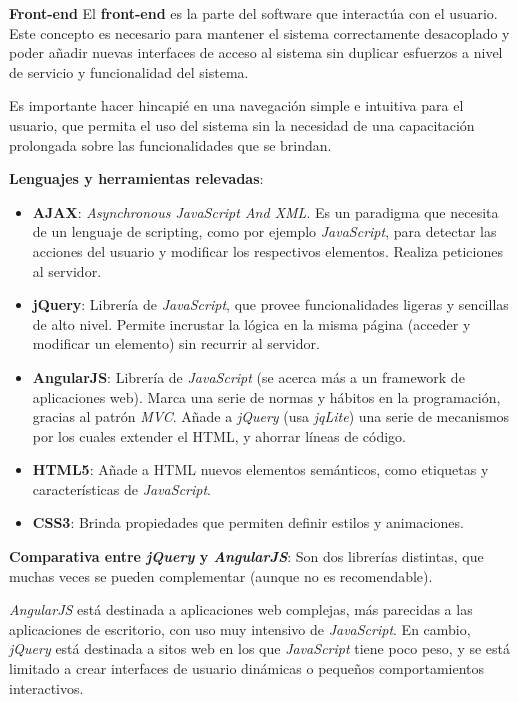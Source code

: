 \textbf{Front-end}
El \textbf{front-end} es la parte del software que interactúa con el usuario.
Este concepto es necesario para mantener el sistema correctamente desacoplado y poder añadir nuevas interfaces de acceso al sistema sin duplicar esfuerzos a nivel de servicio y funcionalidad del sistema.

Es importante hacer hincapié en una navegación simple e intuitiva para el usuario, que permita el uso del sistema sin la necesidad de una capacitación prolongada sobre las funcionalidades que se brindan.


\textbf{Lenguajes y herramientas relevadas}:
\begin{itemize}
\item \textbf{AJAX}: 
\textit{Asynchronous JavaScript And XML}.
Es un paradigma que necesita de un lenguaje de scripting, como por ejemplo \textit{JavaScript}, para detectar las acciones del usuario y modificar los respectivos elementos.
Realiza peticiones al servidor. 

\item \textbf{jQuery}:
Librería de \textit{JavaScript}, que provee funcionalidades ligeras y sencillas de alto nivel.
Permite incrustar la lógica en la misma página (acceder y modificar un elemento) sin recurrir al servidor.

\item \textbf{AngularJS}:
Librería de \textit{JavaScript} (se acerca más a un framework de aplicaciones web).
Marca una serie de normas y hábitos en la programación, gracias al patrón \textit{MVC}.
Añade a \textit{jQuery} (usa \textit{jqLite}) una serie de mecanismos por los cuales extender el HTML, y ahorrar líneas de código.

\item \textbf{HTML5}:
Añade a HTML nuevos elementos semánticos, como etiquetas y características de \textit{JavaScript}.

\item \textbf{CSS3}:
Brinda propiedades que permiten definir estilos y animaciones.
\end{itemize}

\textbf{Comparativa entre \textit{jQuery} y \textit{AngularJS}}:
Son dos librerías distintas, que muchas veces se pueden complementar (aunque no es recomendable).

\textit{AngularJS} está destinada a aplicaciones web complejas, más parecidas a las aplicaciones de escritorio, con uso muy intensivo de \textit{JavaScript}.
En cambio, \textit{jQuery} está destinada a sitos web en los que \textit{JavaScript} tiene poco peso, y se está limitado a crear interfaces de usuario dinámicas o pequeños comportamientos interactivos.

